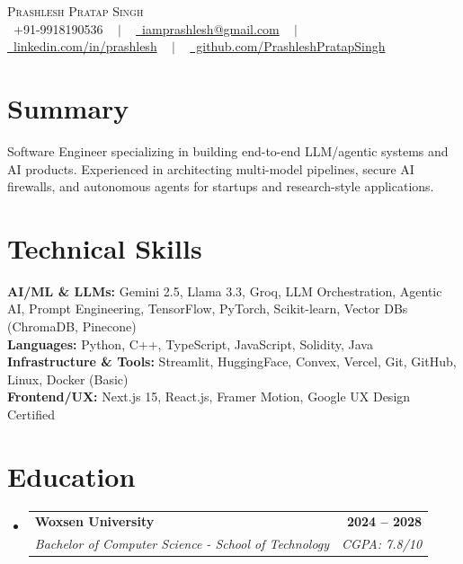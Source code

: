 \documentclass[letterpaper,11pt]{article}
\makeatletter
\newcommand{\resumeSubheading}[4]{
  \vspace{-1pt}\item
    \begin{tabular*}{1.0\textwidth}[t]{l@{\extracolsep{\fill}}r}
      \textbf{#1} & \textbf{\small #2} \\
      \textit{\small#3} & \textit{\small #4} \\
    \end{tabular*}\vspace{-4pt}
}
\newcommand{\resumeSubHeadingListStart}{\begin{itemize}[leftmargin=0.0in, label={}]}
\newcommand{\resumeSubHeadingListEnd}{\end{itemize}}
\makeatother
\begin{document}
\begin{center}
    {\Huge \scshape Prashlesh Pratap Singh} \\ \vspace{2pt}
    \small 
    \raisebox{-0.1\height}\faPhone\ +91-9918190536 ~ $|$ ~ 
    \href{mailto:iamprashlesh@gmail.com}{\raisebox{-0.2\height}\faEnvelope\ iamprashlesh@gmail.com} ~ $|$ ~ 
    \href{https://linkedin.com/in/prashlesh}{\raisebox{-0.2\height}\faLinkedin\ linkedin.com/in/prashlesh} ~ $|$ ~
    \href{https://github.com/PrashleshPratapSingh}{\raisebox{-0.2\height}\faGithub\ github.com/PrashleshPratapSingh}
\end{center}

\vspace{-12pt}
\section{Summary}
\small{Software Engineer specializing in building end-to-end LLM/agentic systems and AI products. Experienced in architecting multi-model pipelines, secure AI firewalls, and autonomous agents for startups and research-style applications.}
\vspace{-5pt}

\section{Technical Skills}
 \begin{itemize}[leftmargin=0.15in, label={}]
    \small{\item{
     \textbf{AI/ML \& LLMs:}{ Gemini 2.5, Llama 3.3, Groq, LLM Orchestration, Agentic AI, Prompt Engineering, TensorFlow, PyTorch, Scikit-learn, Vector DBs (ChromaDB, Pinecone)} \\
     \textbf{Languages:}{ Python, C++, TypeScript, JavaScript, Solidity, Java} \\
     \textbf{Infrastructure \& Tools:}{ Streamlit, HuggingFace, Convex, Vercel, Git, GitHub, Linux, Docker (Basic)} \\
     \textbf{Frontend/UX:}{ Next.js 15, React.js, Framer Motion, Google UX Design Certified} \\
    }}
 \end{itemize}
 \vspace{-12pt}

\section{Education}
  \resumeSubHeadingListStart
    \resumeSubheading
      {Woxsen University}{2024 -- 2028}
      {Bachelor of Computer Science - School of Technology}{CGPA: 7.8/10}
  \resumeSubHeadingListEnd
\end{document}
